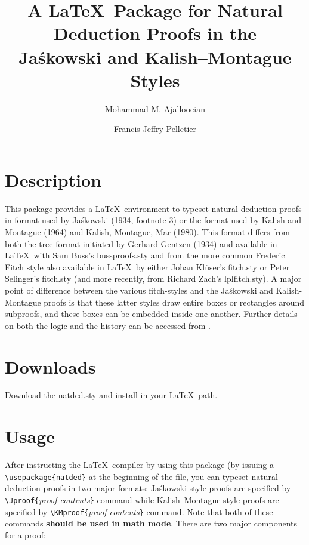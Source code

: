 \documentclass{article}
\title{A \LaTeX\, Package for Natural Deduction Proofs in the \\ Ja\'skowski and Kalish--Montague Styles}
\author{Mohammad M. Ajallooeian \and Francis Jeffry Pelletier}
\date{}
\newcommand{\Jas}{Ja\'skowski }
\newcommand{\KM}{Kalish-Montague }
\begin{document}
\maketitle

\section{Description}

This package provides a \LaTeX\, environment to typeset natural deduction proofs in format used by Ja\'skowski (1934, footnote 3) or the format used by Kalish and Montague (1964) and Kalish, Montague, Mar (1980).  This format differs from both the tree format initiated by Gerhard Gentzen (1934) and available in \LaTeX\, with Sam Buss's bussproofs.sty and from the more common Frederic Fitch style also available in \LaTeX\, by either Johan Kl\"user's fitch.sty or Peter Selinger's fitch.sty (and more recently, from Richard Zach's lplfitch.sty).  A major point of difference between the various fitch-styles and the \Jas and \KM proofs is that these latter styles  draw entire boxes or rectangles around subproofs, and these boxes can be embedded inside one another.  Further details on both the logic and the history can be accessed from \cite{ext14}.

\section{Downloads}

Download the natded.sty and install in your \LaTeX\ path.

\section{Usage}

After instructing the \LaTeX\, compiler by using this package (by issuing a \verb+\usepackage{natded}+ at the beginning of the file, you can typeset natural deduction proofs in two major formats: Ja\'skowski-style proofs are specified by \verb+\Jproof{+\emph{proof contents}\verb+}+ command while Kalish--Montague-style proofs are specified by \verb+\KMproof{+\emph{proof contents}\verb+}+ command. Note that both of these commands \textbf{should be used in math mode}. There are two major components for a proof: 

\medskip
\end{document}
